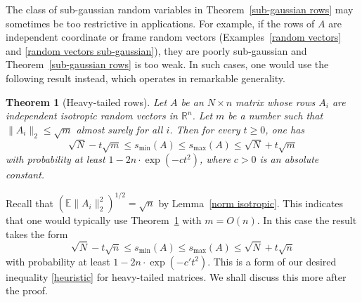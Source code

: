 \documentclass[10pt, openany]{book}
\newtheorem{theorem}{Theorem}[chapter]
\theoremstyle{remark}
\def \R {\mathbb{R}}
\def \E {\mathbb{E}}
\def \smin {s_{\min}}
\def \smax {s_{\max}}
\begin{document}
The class of sub-gaussian random variables in Theorem~\ref{sub-gaussian rows} may sometimes
be too restrictive in applications. For example, if the rows of $A$ 
are independent coordinate or frame random vectors 
(Examples~\ref{random vectors} and \ref{random vectors sub-gaussian}), 
they are poorly sub-gaussian and Theorem~\ref{sub-gaussian rows} is too weak.
In such cases, one would use the following result instead, which operates in remarkable generality.

\begin{theorem}[Heavy-tailed rows]	  \label{heavy-tailed rows}
  Let $A$ be an $N \times n$ matrix whose rows $A_i$ are independent
  isotropic random vectors in $\R^n$. Let $m$ be a number such that 
  $\|A_i\|_2 \le \sqrt{m}$ almost surely for all $i$. 
  Then for every $t \ge 0$, one has
  \begin{equation}							\label{eq heavy-tailed rows}
  \sqrt{N} - t \sqrt{m} \le \smin(A) \le \smax(A) \le \sqrt{N} + t \sqrt{m}
  \end{equation}
  with probability at least $1 - 2 n \cdot \exp(-ct^2)$, 
  where $c>0$ is an absolute constant.
\end{theorem}

Recall that $(\E \|A_i\|_2^2)^{1/2} = \sqrt{n}$ by Lemma~\ref{norm isotropic}. 
This indicates that one would typically use Theorem~\ref{heavy-tailed rows} with $m = O(n)$. 
In this case the result takes the form 
\begin{equation}							\label{heavy-tailed m=n}
\sqrt{N} - t \sqrt{n} \le \smin(A) \le \smax(A) \le \sqrt{N} + t \sqrt{n}
\end{equation}
with probability at least $1 - 2n \cdot \exp(-c't^2)$. This is a form of our desired inequality
\eqref{heuristic} for heavy-tailed matrices. We shall discuss this more after the proof.
\end{document}
